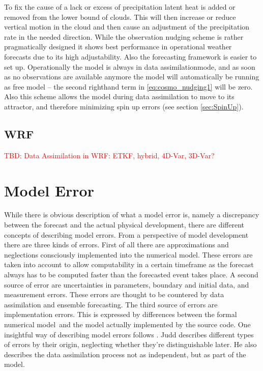 \p
To fix the cause of a lack or excess of precipitation latent heat is added or removed from the lower bound of clouds. This will then increase or reduce vertical motion in the cloud and then cause an adjustment of the precipitation rate in the needed direction.
\p
While the observation nudging scheme is rather pragmatically designed it shows best performance in operational weather forecasts due to its high adjustability. Also the forecasting framework is easier to set up. Operationally the model is always in \glqq data assimilation\grqq mode, and as soon as no observations are available anymore the model will automatically be running as free model -- the second righthand term in \eqref{eq:cosmo_nudging1} will be zero.
\p
Also this scheme allows the model during data assimilation to move to its attractor, and therefore minimizing spin up errors (see section \ref{sec:SpinUp}). 
\subsection{WRF}
\p
\textcolor{red}{TBD: Data Assimilation in WRF: ETKF, hybrid, 4D-Var, 3D-Var?}
\section{Model Error}
While there is obvious description of what a model error is, namely a discrepancy between the forecast and the actual physical development, there are different concepts of describing model errors.
\p
From a perspective of model development there are three kinds of errors. First of all there are approximations and neglections consciously implemented into the numerical model. These errors are taken into account to allow computability in a certain timeframe as the forecast always has to be computed faster than the forecasted event takes place. A second source of error are uncertainties in parameters, boundary and initial data, and measurement errors. These errors are thought to be countered by data assimilation and ensemble forecasting. The third source of errors are implementation errors. This is expressed by differences between the formal \glqq numerical model\grqq\ and the model actually implemented by the source code.
\p                                
One insightful way of describing model errors follows \cite{judd2008geometry}. Judd describes different types of errors by their origin, neglecting whether they're distinguishable later. He also describes the data assimilation process not as independent, but as part of the model.
